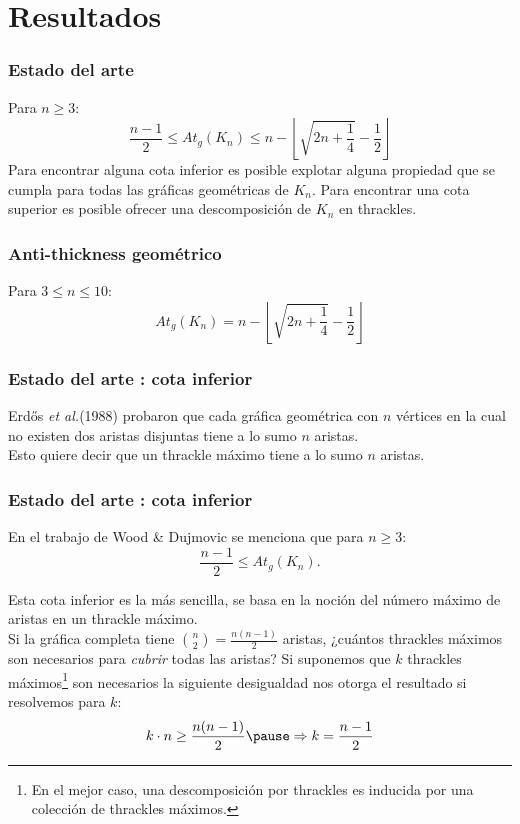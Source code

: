 \section{Resultados}
\begin{frame}
\frametitle{Estado del arte}
Para $n \geq 3$:
\[  \frac{n-1}{2} \leq At_g(K_n) \leq n - \left\lfloor\sqrt{2n + \frac{1}{4}} - \frac{1}{2} \right\rfloor \]
Para encontrar alguna cota inferior es posible explotar alguna propiedad que se cumpla para todas las gráficas geométricas de $K_n$. Para encontrar una cota superior es posible ofrecer una descomposición de $K_n$ en thrackles.
\end{frame}
\begin{frame}
\frametitle{Anti-thickness geométrico}
Para $3 \leq n \leq 10$:
\[  At_g(K_n) = n - \left\lfloor\sqrt{2n + \frac{1}{4}} - \frac{1}{2} \right\rfloor \]
\end{frame}

\begin{frame}
\frametitle{Estado del arte : cota inferior}
Erd\H{o}s \emph{et al.}(1988) probaron que cada gráfica geométrica con $n$ vértices en la cual no existen dos aristas disjuntas tiene a lo sumo $n$ aristas. 
\\[10pt]
Esto quiere decir que un thrackle máximo tiene a lo sumo $n$ aristas.
\end{frame}
\begin{frame}
\frametitle{Estado del arte : cota inferior}
En el trabajo de Wood \& Dujmovic se menciona que para $n \geq 3$:
\[  \frac{n-1}{2} \leq At_g(K_n).\] 
\pause

Esta cota inferior es la más sencilla, se basa en la noción del número máximo de aristas en un thrackle máximo. 
\\[5pt]
Si la gráfica completa tiene $\binom{n}{2} = \frac{n(n-1)}{2}$ aristas, ¿cuántos thrackles máximos son necesarios para \emph{cubrir} todas las aristas? Si suponemos que $k$ thrackles máximos\footnote{En el mejor caso, una descomposición por thrackles es inducida por una colección de thrackles máximos.} son necesarios la siguiente desigualdad nos otorga el resultado si resolvemos para $k$: \[ k\cdot n \geq \frac{n(n-1)}{2} \pause \Rightarrow k = \frac{n-1}{2}\]
\end{frame}

